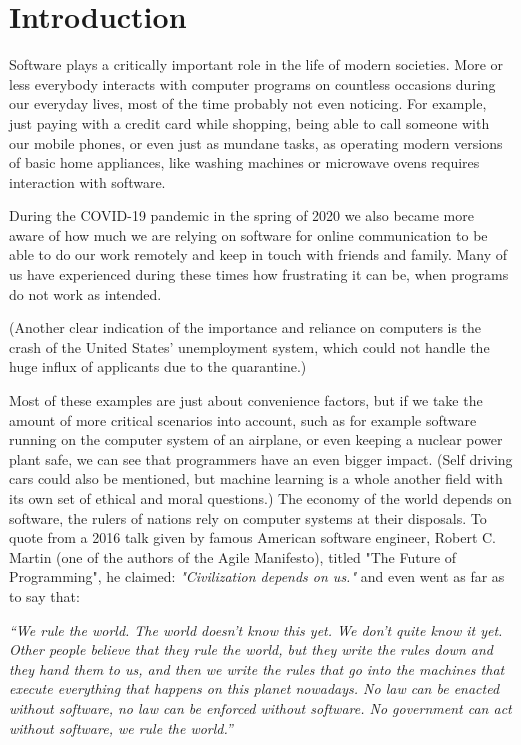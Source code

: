 \chapter{Introduction}
\label{chp:introduction}

Software plays a critically important role in the life of modern societies. More or less everybody interacts with computer programs on countless occasions during our everyday lives, most of the time probably not even noticing. For example, just paying with a credit card while shopping, being able to call someone with our mobile phones, or even just as mundane tasks, as operating modern versions of basic home appliances, like washing machines or microwave ovens requires interaction with software.


During the COVID-19 pandemic in the spring of 2020 we also became more aware of how much we are relying on software for online communication to be able to do our work remotely and keep in touch with friends and family. Many of us have experienced during these times how frustrating it can be, when programs do not work as intended.

(Another clear indication of the importance and reliance on computers is the crash of the United States' unemployment system, which could not handle the huge influx of applicants due to the quarantine.)

Most of these examples are just about convenience factors, but if we take the amount of more critical scenarios into account, such as for example software running on the computer system of an airplane, or even keeping a nuclear power plant safe, we can see that programmers have an even bigger impact. (Self driving cars could also be mentioned, but machine learning is a whole another field with its own set of ethical and moral questions.) The economy of the world depends on software, the rulers of nations rely on computer systems at their disposals. To quote from a 2016 talk given by famous American software engineer, Robert C. Martin (one of the authors of the Agile Manifesto), titled "The Future of Programming", he claimed: \textit{"Civilization depends on us."} and even went as far as to say that:

\textit{``We rule the world. The world doesn't know this yet. We don't quite know it yet. Other people believe that they rule the world, but they write the rules down and they hand them to us, and then we write the rules that go into the machines that execute everything that happens on this planet nowadays. No law can be enacted without software, no law can be enforced without software. No government can act without software, we rule the world.''}

